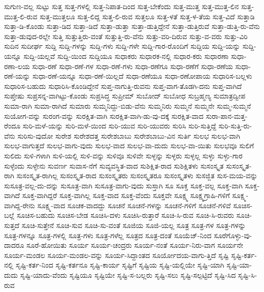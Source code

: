 {ಸುಗುಣ-ವಲ್ಲ
ಸುಟ್ಟು
ಸುತ್ತ
ಸುತ್ತ-ಗಳಲ್ಲಿ
ಸುತ್ತ-ನಿಪಾತ-ದಿಂದ
ಸುತ್ತ-ಬೇಕೆಂದು
ಸುತ್ತ-ಮುತ್ತ
ಸುತ್ತ-ಮುತ್ತ-ಲಿನ
ಸುತ್ತ-ಮುತ್ತ-ಲಿ-ರುವ
ಸುತ್ತ-ಮುತ್ತಲೂ
ಸುತ್ತ-ಲಿದ್ದ
ಸುತ್ತ-ಲಿ-ರುವ
ಸುತ್ತಲೂ
ಸುತ್ತ-ಳತೆ
ಸುತ್ತ-ಳ-ತೆಯ
ಸುತ್ತ-ವಿದೆ
ಸುತ್ತಾಡಿ
ಸುತ್ತಾ-ಡಿ-ಕೊಂಡು
ಸುತ್ತಾ-ಡಿದ
ಸುತ್ತಾ-ಡಿದೆ
ಸುತ್ತಾ-ಡುತ್ತಾ
ಸುತ್ತಾ-ಡುತ್ತಿದ್ದೇನೆ
ಸುತ್ತಾ-ಡುತ್ತಿರುವೆ
ಸುತ್ತಾ-ಡುತ್ತಿ-ರು-ವೆನು
ಸುತ್ತಾ-ಡುವುದ-ರಲ್ಲೇ
ಸುತ್ತಿ
ಸುತ್ತುತ್ತಿರು-ವಂತೆ
ಸುತ್ತುತ್ತಿ-ರು-ವೆನು
ಸುತ್ತು-ವರಿ-ದಿರುವ
ಸುತ್ತು-ವ-ವರು
ಸುತ್ತು-ವಿರಿ
ಸುದಿನ
ಸುದೀರ್ಘ
ಸುದ್ದಿ
ಸುದ್ದಿ-ಗಳನ್ನು
ಸುದ್ದಿ-ಗಳು
ಸುದ್ದಿ-ಗಳೇ
ಸುದ್ದಿ-ಗಾರ-ರೊಂದಿಗೆ
ಸುದ್ದಿಯ
ಸುದ್ದಿ-ಯನ್ನು
ಸುದ್ದಿ-ಯನ್ನೂ
ಸುದ್ದಿ-ಯಲ್ಲವೆ
ಸುದ್ದಿ-ಯಿಂದ
ಸುದ್ದಿಯೂ
ಸುಧಾಕರು
ಸುಧಾರಕ-ನಲ್ಲಿ
ಸುಧಾರ-ಕರು
ಸುಧಾರಣಾ
ಸುಧಾ-ರಣಾ-ಲಯ
ಸುಧಾ-ರಣೆ
ಸುಧಾ-ರಣೆ-ಗಳ
ಸುಧಾ-ರಣೆ-ಗಳು
ಸುಧಾ-ರಣೆಗೂ
ಸುಧಾ-ರಣೆಗೆ
ಸುಧಾ-ರಣೆಯ
ಸುಧಾ-ರಣೆ-ಯನ್ನು
ಸುಧಾ-ರಣೆ-ಯನ್ನೂ
ಸುಧಾ-ರಣೆ-ಯಿಲ್ಲದೆ
ಸುಧಾ-ರಣೆಯೂ
ಸುಧಾ-ರಣೋಪಾಯ
ಸುಧಾರಿಸ-ಬಲ್ಲಳು
ಸುಧಾರಿಸ-ಬಹುದು
ಸುಧಾರಿಸಿ-ಕೊಂಡಿದ್ದೇನೆ
ಸುಪ್ತ-ನಾಗುತ್ತಿ-ರುವನು
ಸುಪ್ತ-ವಾಗ-ತೊಡಗಿ-ದನು
ಸುಪ್ತ-ವಾಗಿದೆ
ಸುಪ್ತೇಷು
ಸುಪ್ರಸನ್ನ-ವಾಗಿಟ್ಟು-ಕೊಂಡು
ಸುಪ್ರಸಿದ್ಧ
ಸುಪ್ರೀಮ್
ಸುಬೋದ್
ಸುಬೋಧ
ಸುಬ್ರಹ್ಮಣ್ಯ
ಸುಮಾತ್ರದ್ವೀಪ
ಸುಮಾ-ರಾಗಿ
ಸುಮಾ-ರಾಗಿದೆ
ಸುಮಾರು
ಸುಮ್ಮನಿದ್ದು-ಬಿಡು-ವೆನು
ಸುಮ್ಮನಿರು
ಸುಮ್ಮನೆ
ಸುಮ್ಮನೇ
ಸುಮ್ಮ-ಸುಮ್ಮನೆ
ಸುಯೋಗ-ವನ್ನು
ಸುರಂಗ-ವನ್ನು
ಸುರಕ್ಷಿತ-ವಾಗಿ
ಸುರಕ್ಷಿತ-ವಾಗಿ-ಡು-ವು-ದಕ್ಕೆ
ಸುರಕ್ಷಿತ-ವಾದ
ಸುರಾ-ಪಾನ-ಮತ್ತ-ರೆಂದೂ
ಸುರಿ-ಮಳೆ-ಯನ್ನು
ಸುರಿ-ಮಳೆ-ಯಿಂದ
ಸುರಿ-ಯುವ
ಸುರಿ-ಯುವರು
ಸುರಿಸಿ
ಸುರಿ-ಸುತ್ತಿದ್ದೆ
ಸುರಿ-ಸುತ್ತಿ-ರು-ವೆನು
ಸುರಿಸು-ವುದೋ
ಸುರೇಶ
ಸುರೇಶದತ್ತ
ಸುರೇಶಬಾಬು
ಸುರೇಶಬಾಬು-ವಿನ
ಸುರ್ತಿ
ಸುಲಭ
ಸುಲಭ-ವಾಗಿ
ಸುಲಭ-ವಾಗುತ್ತದೆ
ಸುಲಭ-ವಾಗು-ವುದು
ಸುಲಭ-ವಾದ
ಸುಲಭ-ವಾ-ದುದು
ಸುಲಭ-ವಾ-ಯಿತು
ಸುಲಭವೂ
ಸುಲಿಗೆ
ಸುಲಿದು
ಸುಳಿ-ಗಳಾಗಿ
ಸುಳಿ-ಯಲ್ಲಿ
ಸುಳಿ-ವನ್ನು
ಸುಳಿವೂ
ಸುಳಿವೇ
ಸುಳ್ಳನ್ನು
ಸುಳ್ಳರು
ಸುಳ್ಳಲ್ಲ
ಸುಳ್ಳು
ಸುಳ್ಳು-ಗಾರ
ಸುಳ್ಳೆಂದು
ಸುಳ್ಳೇನು
ಸುವರ್ಣ
ಸುವಾಸ-ನೆಗೆ
ಸುವ್ಯವಸ್ಥಿತ-ವಾದ
ಸುಶಿಕ್ಷಿತ-ರಾದ
ಸುಶಿಕ್ಷಿತಳು
ಸುಸಂಸ್ಕೃತ
ಸುಸಂಸ್ಕೃತ-ರಾಗಿ
ಸುಸಂಸ್ಕೃತ-ರಾಗಿಲ್ಲ
ಸುಸಂಸ್ಕೃತ-ರಾದ
ಸುಸಂಸ್ಕೃತರು
ಸುಸಂಸ್ಕೃತರೂ
ಸುಸಂಸ್ಕೃತಳು
ಸುಸಜ್ಜಿತ
ಸುಸ-ಮಯ-ವನ್ನು
ಸುಸೂತ್ರ-ವಲ್ಲ-ದು-ದನ್ನು
ಸುಸೂತ್ರ-ವಾಗಿ
ಸುಸೂತ್ರ-ವಾಗು-ವುದು
ಸುಸ್ತಾಗಿ
ಸೂ
ಸೂಕ್ತ
ಸೂಕ್ತ-ವಲ್ಲ
ಸೂಕ್ತ-ವಾಗಿ
ಸೂಕ್ತ-ವಾಗಿದೆ
ಸೂಕ್ತ-ವಾಗಿದ್ದರೆ
ಸೂಕ್ತ-ವಾಗಿಲ್ಲ
ಸೂಕ್ತ-ವಾದ
ಸೂಕ್ತ-ವೆಂದು
ಸೂಕ್ತವೇ
ಸೂಕ್ಷ್ಮ
ಸೂಕ್ಷ್ಮಗ್ರಾಹಿ-ಗಳಿಗೆ
ಸೂಕ್ಷ್ಮ-ವಾಗಿದ್ದ-ರೇನು
ಸೂಕ್ಷ್ಮ-ವಾದ
ಸೂಚಕ-ವಾದದ್ದು
ಸೂಚನೆ
ಸೂಚನೆ-ಗಳನ್ನು
ಸೂಚನೆ-ಗಳಿಗೆ
ಸೂಚನೆ-ಗಳಿವೆ
ಸೂಚಿಸ-ಬಲ್ಲೆ
ಸೂಚಿಸ-ಬಹುದು
ಸೂಚಿಸ-ಬೇಡ
ಸೂಚಿಸಿ-ದಳು
ಸೂಚಿಸಿ-ರುತ್ತಾರೆ
ಸೂಚಿ-ಸಿ-ರುವ
ಸೂಚಿ-ಸಿ-ರುವರು
ಸೂಚಿ-ಸುತ್ತದೆ
ಸೂಚಿ-ಸುತ್ತೇನೆ
ಸೂಚಿ-ಸುವ
ಸೂಚಿ-ಸು-ವಂತೆ
ಸೂಜಿಯ
ಸೂಜಿ-ಯಲ್ಲ
ಸೂತ್ರ
ಸೂತ್ರ-ಗಳ
ಸೂತ್ರ-ಗಳನ್ನು
ಸೂತ್ರ-ಗಳನ್ನೂ
ಸೂತ್ರ-ಗಳಲ್ಲಿ
ಸೂತ್ರ-ಗಳು
ಸೂತ್ರ-ಗಳೆಲ್ಲ
ಸೂತ್ರದ
ಸೂತ್ರ-ದಂತೆ
ಸೂಯೆಜ್-ನಿಂದ
ಸೂರೆಗೊಳ್ಳು-ವು-ದಾದರೂ
ಸೂರೆ-ಹೋಯಿತು
ಸೂರ್ಯ
ಸೂರ್ಯ-ಚಂದ್ರರು
ಸೂರ್ಯ-ನಂತೆ
ಸೂರ್ಯ-ನಿರು-ವಾಗ
ಸೂರ್ಯನೇ
ಸೂರ್ಯ-ಮಂಡಲ
ಸೂರ್ಯ-ಮಂಡಲ-ವನ್ನು
ಸೂರ್ಯ-ಸಿದ್ದಾಂತದ
ಸೂರ್ಯೋದಯ-ವಾಗು-ತ್ತಿದೆ
ಸೃಷ್ಟಿ
ಸೃಷ್ಟಿ-ಕರ್ತ-ನಲ್ಲಿ
ಸೃಷ್ಟಿ-ಕರ್ತ-ನಿಂದ
ಸೃಷ್ಟಿ-ಕರ್ತನೂ
ಸೃಷ್ಟಿ-ಕಾರ್ಯ
ಸೃಷ್ಟಿಗೆ
ಸೃಷ್ಟಿಯ
ಸೃಷ್ಟಿ-ಯಲ್ಲಿಯೇ
ಸೃಷ್ಟಿ-ಯಾಗಿ
ಸೃಷ್ಟಿ-ಯಾ-ದುದು
ಸೃಷ್ಟಿ-ಯಾದು-ವೆಂದು
ಸೃಷ್ಟಿಯೂ
ಸೃಷ್ಟಿಯೇ
ಸೃಷ್ಟಿ-ಸ-ಬಲ್ಲರು
ಸೃಷ್ಟಿ-ಸಲು
ಸೃಷ್ಟಿ-ಸಲ್ಪಟ್ಟಿದೆ
ಸೃಷ್ಟಿ-ಸಿದ
ಸೃಷ್ಟಿ-ಸಿ-ರುವ
}
